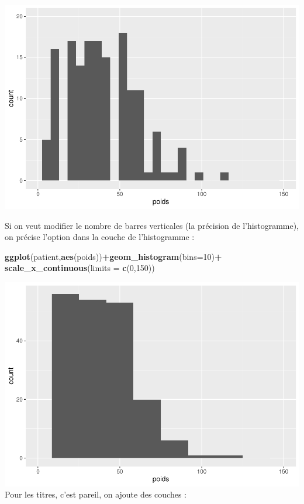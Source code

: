 \documentclass[
]{book}
\newenvironment{Shaded}{\begin{snugshade}}{\end{snugshade}}
\newcommand{\AttributeTok}[1]{\textcolor[rgb]{0.13,0.29,0.53}{#1}}
\newcommand{\DecValTok}[1]{\textcolor[rgb]{0.00,0.00,0.81}{#1}}
\newcommand{\FunctionTok}[1]{\textcolor[rgb]{0.13,0.29,0.53}{\textbf{#1}}}
\newcommand{\NormalTok}[1]{#1}
\newcommand{\SpecialCharTok}[1]{\textcolor[rgb]{0.81,0.36,0.00}{\textbf{#1}}}
\begin{document}
\includegraphics{_main_files/figure-latex/ggplot4-1.pdf}

Si on veut modifier le nombre de barres verticales (la précision de l'histogramme),
on précise l'option dans la couche de l'histogramme :

\begin{Shaded}
\begin{Highlighting}[]
\FunctionTok{ggplot}\NormalTok{(patient,}\FunctionTok{aes}\NormalTok{(poids))}\SpecialCharTok{+}\FunctionTok{geom\_histogram}\NormalTok{(}\AttributeTok{bins=}\DecValTok{10}\NormalTok{)}\SpecialCharTok{+}
  \FunctionTok{scale\_x\_continuous}\NormalTok{(}\AttributeTok{limits =} \FunctionTok{c}\NormalTok{(}\DecValTok{0}\NormalTok{,}\DecValTok{150}\NormalTok{))}
\end{Highlighting}
\end{Shaded}

\includegraphics{_main_files/figure-latex/ggplot5-1.pdf}
Pour les titres, c'est pareil, on ajoute des couches :
\end{document}
